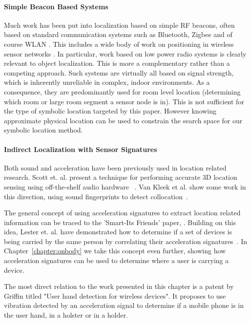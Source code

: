 \paragraph{Simple Beacon Based Systems}
Much work has been put into localization based on simple RF beacons,
often based on standard communication systems such as Bluetooth,
Zigbee and of course WLAN \cite{placeLab05,radar,krumm03ubicomp}. This includes a wide body of work on
positioning in wireless sensor networks \cite{dopigha01}. In
particular, work based on low power radio systems is clearly relevant
to object localization. This is more a complementary rather than a
competing approach. Such systems are virtually all based on signal
strength, which is inherently unreliable in complex, indoor
environments. As a consequence, they are predominantly used for room
level location (determining which room or large room segment a sensor
node is in). This is not sufficient for the type of symbolic location
targeted by this paper. However knowing approximate physical location
can be used to constrain the search space for our symbolic location
method.

\paragraph{Indirect Localization with Sensor Signatures}
Both sound and acceleration have been previously used in location related
research. Scott et. al. present a technique for performing accurate 3D location sensing using off-the-shelf audio hardware~\cite{scott05audiolocation} . 
Van Kleek et al. show some work in this direction, using sound fingerprints
to detect collocation~\cite{opf}.

The general concept of using acceleration signatures to extract
location related information can be traced to the 'Smart-Its Friends'
paper, \cite{smartits}. Building on this idea, Lester et. al. have
demonstrated how to determine if a set of devices is being carried by
the same person by correlating their acceleration
signatures~\cite{lester2004are}. In Chapter~\ref{chapter:onbody} we
take this concept even further, showing how acceleration signatures
can be used to determine where a user is carrying a device.

The most direct relation to the work presented in this chapter is a
patent by Griffin \cite{grifpatent} titled "User hand detection for
wireless devices". It proposes to use vibration detected by an
acceleration signal to determine if a mobile phone is in the user
hand, in a holster or in a holder.


